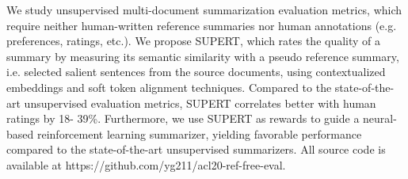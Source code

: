 We study unsupervised multi-document summarization evaluation metrics, which require neither human-written reference summaries nor human annotations (e.g. preferences, ratings, etc.). We propose SUPERT, which rates the quality of a summary by measuring its semantic similarity with a pseudo reference summary, i.e. selected salient sentences from the source documents, using contextualized embeddings and soft token alignment techniques. Compared to the state-of-the-art unsupervised evaluation metrics, SUPERT correlates better with human ratings by 18- 39\%. Furthermore, we use SUPERT as rewards to guide a neural-based reinforcement learning summarizer, yielding favorable performance compared to the state-of-the-art unsupervised summarizers. All source code is available at https://github.com/yg211/acl20-ref-free-eval.

